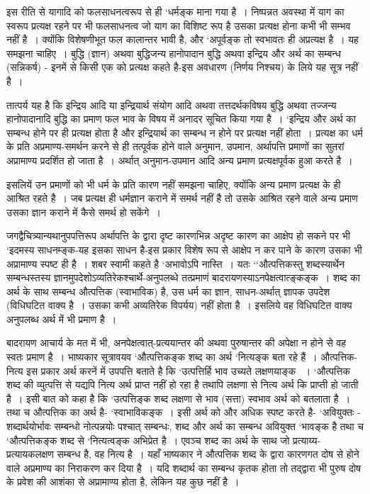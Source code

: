 {इस रीति से यागादि को फलसाधनत्वरूप से ही ‘धर्मङ्क माना गया है~। निष्पन्नत अवस्था में याग का स्वरूप प्रत्यक्ष रहने पर भी फलसाधनत्व जो याग का विशिष्ट रूप है उसका प्रत्यक्ष होना कभी भी सम्भव नहीं है~। क्योंकि विशेषणीभूत फल कालान्तर भावी है, और ‘अपूर्वङ्क तो स्वभावतः ही अप्रत्यक्ष है~। यह समझना चाहिए~। बुद्धि (ज्ञान) अथवा बुद्धिजन्य हानोपादान बुद्धि अथवा इन्द्रिय और अर्थ का सम्बन्ध (सन्निकर्ष) - इनमें से किसी एक को प्रत्यक्ष कहते है-इस अवधारण (निर्णय निश्चय) के लिये यह सूत्र नहीं है~। 

तात्पर्य यह है कि इन्द्रिय आदि या इन्द्रियार्थ संयोग आदि अथवा तत्तदर्थकविषय बुद्धि अथवा तज्जन्य हानोपादानादि बुद्धि का प्रमाण फल भाव के विषय में अनादर सूचित किया गया है~। ‘इन्द्रिय और अर्थ का सम्बन्ध होने पर ही प्रत्यक्ष होता है और इन्द्रियार्थ का सम्बन्ध न होने पर प्रत्यक्ष नहीं होता~। प्रत्यक्ष का धर्म के प्रति अप्रमाण्य-समर्थन करने से ही तत्पूर्वक होने वाले अनुमान, उपमान, अर्थापत्ति प्रमाणों का सुतरां अप्रामाण्य प्रदर्शित हो जाता है~। अर्थात् अनुमान-उपमान आदि अन्य प्रमाण प्रत्यक्षपूर्वक हुआ करते है~। 

इसलियें उन प्रमाणों को भी धर्म के प्रति कारण नहीं समझना चाहिए, क्योंकि अन्य प्रमाण प्रत्यक्ष के ही आश्रित रहते है~। जब प्रत्यक्ष ही धर्मज्ञान कराने में समर्थ नहीं है तो उसके आश्रित रहने वाले अन्य प्रमाण उसका ज्ञान कराने में कैसे समर्थ हो सकेंगे~। 

जगद्वैचित्र्यान्यथानुपपत्तिरूप अर्थापत्ति के द्वारा दृष्ट कारणभिन्न अदृष्ट कारण का आक्षेप हो सकने पर भी ‘इदमस्य साधनम्ङ्क-यह इसका साधन है-इस प्रकार विशेष रूप से आक्षेप न कर पाने के कारण उसका भी अप्रामाण्य स्पष्ट ही है~। शबर स्वामी कहते है ‘अभावोऽपि नास्ति~। यतः ‘‘औत्पत्तिकस्तु शब्दस्यार्थेन सम्बन्धस्तस्य ज्ञानमुपदेशोऽव्यतिरेकश्चार्थे-अनुपलब्धे तत्प्रमाणं बादरायणस्याऽनपेक्षत्वात्ङ्कङ्क~। शब्द का अर्थ के साथ सम्बन्ध औत्पत्तिक (स्वाभाविक) है, उस धर्म का ज्ञान, साधन-अर्थात् ज्ञापक उपदेश (विधिघटित वाक्य है~। उसका कभी अव्यतिरेक विपर्यय) नहीं होता है~। इसलिये वह विधिघटित वाक्य अनुपलब्ध अर्थ में भी प्रमाण है~। 

बादरायण आचार्य के मत में भी, अनपेक्षत्वात्-प्रत्ययान्तर की अथवा पुरुषान्तर की अपेक्षा न होने से वह स्वतः प्रमाण है~। भाष्यकार सूत्रावयव ‘औत्पत्तिकङ्क शब्द का अर्थ ‘नित्यङ्क बता रहे हैं~। औत्पत्तिक-नित्य इस प्रकार अर्थ करनें में उपपत्ति बताते है कि ‘उत्पत्तिर्हि भाव उच्यते लक्षणयाङ्क ~। ‘औत्पत्तिक शब्द की व्युत्पत्ति से यद्यपि नित्य अर्थ प्राप्त नहीं हो रहा है तथापि लक्षणा से नित्य अर्थ कि प्राप्ती हो जाती है~। इसी बात को कहा है कि ‘उत्पत्तिङ्क शब्द लक्षणा से भाव (सत्ता) स्वभाव अर्थ को बतलाता है~। तथा च औत्पत्तिक का अर्थ है- ‘स्वाभाविकङ्क~। इसी अर्थ को और अधिक स्पष्ट करते है- ‘अवियुक्तः - शब्दार्थयोर्भावः सम्बन्धो नोत्पन्नयोः पश्चात् सम्बन्धः, शब्द और अर्थ का सम्बन्ध अवियुक्त ‘भावङ्क है तथा च ‘औत्पत्तिकङ्क शब्द से ‘नित्यत्वङ्क अभिप्रेत है~। एवञ्च शब्द का अर्थ के साथ जो प्रत्याय्य-प्रत्यायकलक्षण सम्बन्ध है, वह नित्य है~। यहाँ भाष्यकार ने औत्पत्तिक शब्द के द्वारा कारणगत दोष से होने वाले अप्रमाण्य का निराकरण कर दिया है~। यदि शब्दार्थ का सम्बन्ध कृतक होता तो तद्द्वारा भी पुरुष दोष के प्रवेश की आशंका से अप्रामाण्य होता है, लेकिन यह कुछ नहीं है~। 

}
